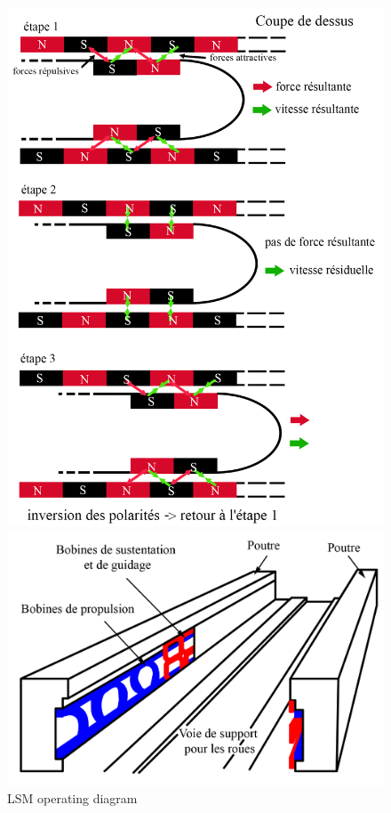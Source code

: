 \documentclass[12pt, a4paper, onecolumn]{article}
\begin{document}
\begin{figure}[H]
  \centering
  \begin{minipage}{.51\linewidth}
    \includegraphics[width=\textwidth]{img/schemaLSM.png}
    \caption{LSM operating diagram}
    \label{schemaLSM}
  \end{minipage}
  \begin{minipage}{.48\linewidth}
    \includegraphics[width=\textwidth]{img/voirie.png}

\end{minipage}
\end{figure}
\end{document}
